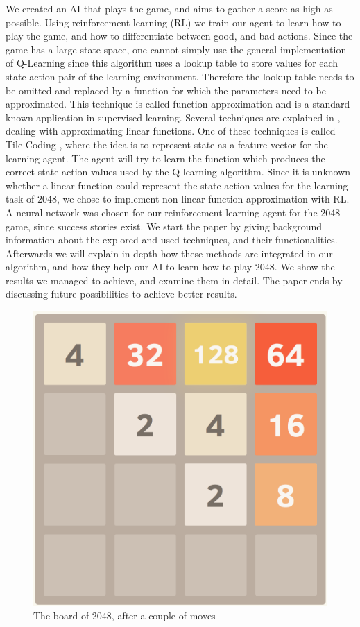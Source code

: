 \documentclass[a4paper,12pt]{article}
\begin{document}
We created an AI that plays the game, and aims to gather a score as high as possible. Using reinforcement learning (RL) \cite{sutton1998rl} we train our agent to learn how to play the game, and how to differentiate between good, and bad actions. 
Since the game has a large state space, one cannot simply use the general implementation of Q-Learning \cite{sutton1998rl} since this algorithm uses a lookup table to store values for each state-action pair of the learning environment.
Therefore the lookup table needs to be omitted and replaced by a function for which the parameters need to be approximated.
This technique is called function approximation and is a standard known application in supervised learning.
Several techniques are explained in \cite{sutton1998rl}, dealing with approximating linear functions.
One of these techniques is called Tile Coding \cite{sutton1998rl}, where the idea is to represent state as a feature vector for the learning agent.
The agent will try to learn the function which produces the correct state-action values used by the Q-learning algorithm.
Since it is unknown whether a linear function could represent the state-action values for the learning task of $2048$, we chose to implement non-linear function approximation with RL.
A neural network was chosen for our reinforcement learning agent for the 2048 game, since success stories exist. \cite{}
 We start the paper by giving background information about the explored and used techniques, and their functionalities. Afterwards we will explain in-depth how these methods are integrated in our algorithm, and how they help our AI to learn how to play $2048$. We show the results we managed to achieve, and examine them in detail. The paper ends by discussing future possibilities to achieve better results.
\begin{figure}[H]
\centering
\includegraphics[scale=0.35]{img/2048board}
\caption{The board of 2048, after a couple of moves}
\label{fig:2048}
\end{figure}
\end{document}
